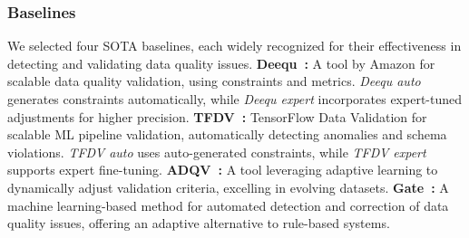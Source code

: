 


\subsubsection{Baselines}
We selected four SOTA baselines, each widely recognized for their effectiveness in detecting and validating data quality issues.
\noindent\textbf{Deequ~\cite{schelter2018automating}:} A tool by Amazon for scalable data quality validation, using constraints and metrics. \textit{Deequ auto} generates constraints automatically, while \textit{Deequ expert} incorporates expert-tuned adjustments for higher precision.
\noindent\textbf{TFDV~\cite{caveness2020tensorflow}:} TensorFlow Data Validation for scalable ML pipeline validation, automatically detecting anomalies and schema violations. \textit{TFDV auto} uses auto-generated constraints, while \textit{TFDV expert} supports expert fine-tuning.
\noindent\textbf{ADQV~\cite{redyuk2021automating}:} A tool leveraging adaptive learning to dynamically adjust validation criteria, excelling in evolving datasets.
\noindent\textbf{Gate~\cite{shankar2023automatic}:} A machine learning-based method for automated detection and correction of data quality issues, offering an adaptive alternative to rule-based systems.

